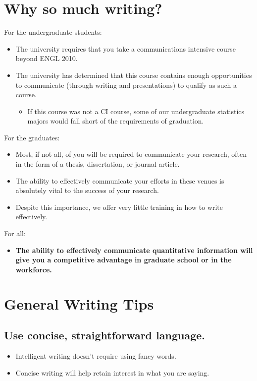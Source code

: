 \documentclass[12pt]{notes}
\begin{document}
\section{Why so much writing?}
For the undergraduate students:
\begin{itemize}
\item The university requires that you take a communications intensive course beyond ENGL 2010.
\item The university has determined that this course contains enough opportunities to communicate (through writing and presentations) to qualify as such a course. 
\begin{itemize}
\item If this course was not a CI course, some of our undergraduate statistics majors would fall short of the requirements of graduation. 
\end{itemize}
\end{itemize}

For the graduates: 
\begin{itemize}
\item Most, if not all, of you will be required to communicate your research, often in the form of a thesis, dissertation, or journal article. 
\item The ability to effectively communicate your efforts in these venues is absolutely vital to the success of your research. 
\item Despite this importance, we offer very little training in how to write effectively. 
\end{itemize}

For all:
\begin{itemize}
\item \textbf{The ability to effectively communicate quantitative information will give you a competitive advantage in graduate school or in the workforce.} 
\end{itemize}

\section{General Writing Tips}

\subsection*{Use concise, straightforward language.}
\begin{itemize}
\item Intelligent writing doesn't require using fancy words. 
\item Concise writing will help retain interest in what you are saying. 
\end{itemize}
\end{document}
